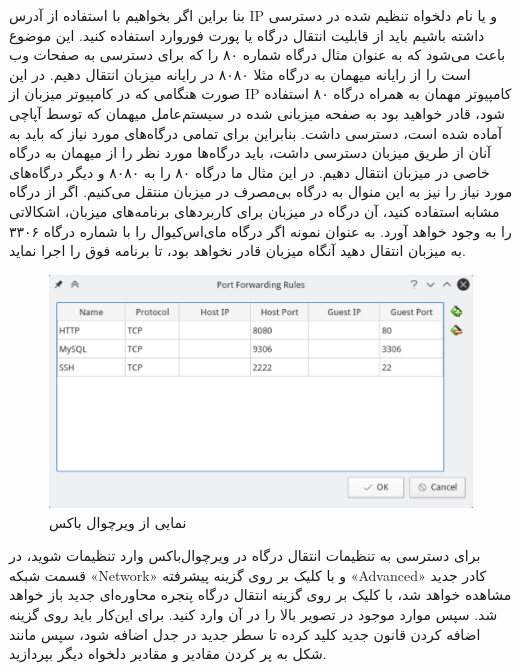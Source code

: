 بنا براین اگر بخواهیم با استفاده از آدرس IP و یا نام دلخواه تنظیم شده در 
 دسترسی داشته باشیم باید از قابلیت انتقال درگاه یا پورت فوروارد استفاده کنید. این موضوع باعث می‌شود که به عنوان مثال درگاه شماره ۸۰ را که برای دسترسی به صفحات وب است را از رایانه میهمان به درگاه مثلا ۸۰۸۰ در رایانه میزبان انتقال دهیم. در این صورت هنگامی که در کامپیوتر میزبان از IP کامپیوتر مهمان به همراه درگاه ۸۰  استفاده شود، قادر خواهید بود به صفحه میزبانی شده در  سیستم‌عامل میهمان  که توسط آپاچی آماده شده است، دسترسی داشت. 
بنابراین برای تمامی درگاه‌های مورد نیاز که باید به آنان از طریق میزبان دسترسی داشت، باید درگاه‌ها مورد نظر را از میهمان به درگاه خاصی در میزبان انتقال دهیم. در این مثال ما درگاه ۸۰ را به ۸۰۸۰ و دیگر درگاه‌های مورد نیاز را نیز به این منوال به درگاه بی‌مصرف در میزبان منتقل می‌کنیم.  اگر از درگاه مشابه استفاده کنید، آن درگاه در میزبان برای کاربردهای برنامه‌های میزبان، اشکالاتی را به وجود خواهد آورد. به عنوان نمونه اگر درگاه مای‌اس‌کیو‌ال را با شماره درگاه ۳۳۰۶ به میزبان انتقال دهید آنگاه میزبان قادر نخواهد بود، تا برنامه فوق را اجرا نماید.
\begin{figure}
    \includegraphics[width=.9\textwidth ,height=.45\textwidth]{Pic/VBox4}
    \caption{ نمایی از ویرچوال باکس}
    \label{VBOX4}
\end{figure}
برای دسترسی به تنظیمات انتقال درگاه در ویرچوال‌باکس وارد تنظیمات شوید، در قسمت شبکه «Network» و با کلیک بر روی گزینه پیشرفته «Advanced» کادر جدید مشاهده خواهد شد،  با کلیک بر روی گزینه انتقال درگاه پنجره محاوره‌ای جدید باز خواهد شد. سپس موارد موجود در تصویر بالا را در آن وارد کنید. برای این‌کار باید روی گزینه اضافه کردن قانون جدید 
 کلید کرده تا سطر جدید در جدل اضافه شود، سپس مانند شکل به پر کردن مقادیر و مقادیر دلخواه دیگر بپردازید.
